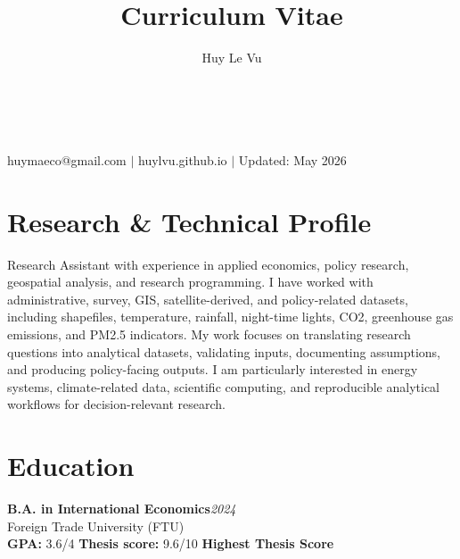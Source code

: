 \documentclass[10pt]{article}
\makeatletter
\newcommand{\cvcolor}{\color{DodgerBlue4}}
\renewcommand{\maketitle}{
\begin{center}
{\Huge\theauthor}\\
\vspace{0.25em}
{\Large \cvcolor{Curriculum Vitae}}\\
{\color{Gray}huymaeco@gmail.com $|$ huylvu.github.io $|$ Updated: May 2026}
\end{center}
}
\makeatother
\begin{document}
\title{Curriculum Vitae}
\author{Huy Le Vu}
\maketitle

\section{Research \& Technical Profile}
Research Assistant with experience in applied economics, policy research, geospatial analysis, and research programming. I have worked with administrative, survey, GIS, satellite-derived, and policy-related datasets, including shapefiles, temperature, rainfall, night-time lights, CO2, greenhouse gas emissions, and PM2.5 indicators. My work focuses on translating research questions into analytical datasets, validating inputs, documenting assumptions, and producing policy-facing outputs. I am particularly interested in energy systems, climate-related data, scientific computing, and reproducible analytical workflows for decision-relevant research.

\section{Education}
\textbf{B.A. in International Economics}\hfill\emph{2024}\\
Foreign Trade University (FTU)\\
\textbf{GPA:} 3.6/4 \quad \textbf{Thesis score:} 9.6/10 \quad \textbf{Highest Thesis Score}
\end{document}
